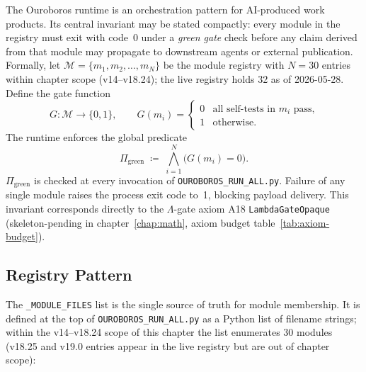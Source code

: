 The Ouroboros runtime is an orchestration pattern for AI-produced work
products.  Its central invariant may be stated compactly: every module in
the registry must exit with code~0 under a \emph{green gate} check before
any claim derived from that module may propagate to downstream agents or
external publication.  Formally, let \(\mathcal{M} = \{m_1, m_2, \ldots,
m_N\}\) be the module registry with \(N = 30\) entries within chapter
scope (v14--v18.24); the live registry holds 32 as of 2026-05-28.
Define the gate function
\[
  G : \mathcal{M} \to \{0, 1\}, \qquad G(m_i) = \begin{cases}
    0 & \text{all self-tests in } m_i \text{ pass,} \\
    1 & \text{otherwise.}
  \end{cases}
\]
The runtime enforces the global predicate
\[
  \Pi_{\mathrm{green}} \;\coloneqq\; \bigwedge_{i=1}^{N} \bigl(G(m_i) = 0\bigr).
\]
\(\Pi_{\mathrm{green}}\) is checked at every invocation of
\texttt{OUROBOROS\_RUN\_ALL.py}.  Failure of any single module raises the
process exit code to~1, blocking payload delivery.  This invariant corresponds
directly to the \(\Lambda\)-gate axiom A18
\texttt{LambdaGateOpaque}~\cite{lutar_frontier_2026}
(skeleton-pending in chapter~\ref{chap:math}, axiom budget table~\ref{tab:axiom-budget}).

\subsection{Registry Pattern}
\label{ssec:registry-pattern}

The \texttt{\_MODULE\_FILES} list is the single source of truth for module
membership.  It is defined at the top of \texttt{OUROBOROS\_RUN\_ALL.py} as
a Python list of filename strings; within the v14--v18.24 scope of this
chapter the list enumerates 30 modules (v18.25 and v19.0 entries appear in
the live registry but are out of chapter scope):

